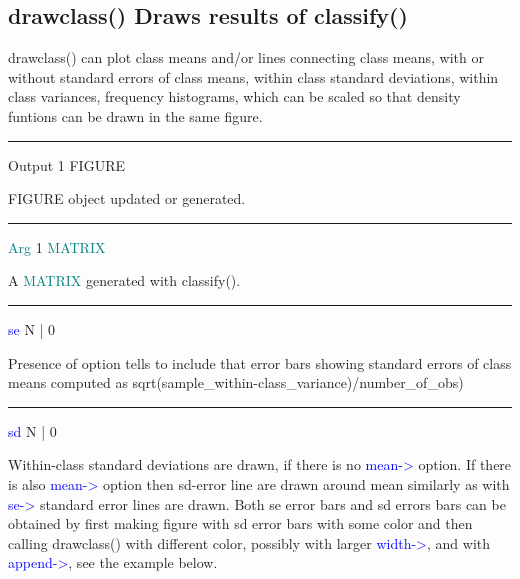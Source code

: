 \subsection{\textcolor{VioletRed}{drawclass}() Draws results of \textcolor{VioletRed}{classify}()} 
\label{drawclass} 
\textcolor{VioletRed}{drawclass}() can plot class means and/or lines connecting class means, with 
or without standard errors of class means, within class standard deviations, 
within class variances, frequency histograms, which can be scaled so that 
density funtions can be drawn in the same figure. 
\vspace{0.3cm} 
\hrule 
\vspace{0.3cm} 
\noindent Output  \tabto{3cm} 1  \tabto{5cm}   FIGURE  \tabto{7cm} 
\begin{changemargin}{3cm}{0cm} 
\noindent  FIGURE object updated or generated. 
\end{changemargin} 
\vspace{0.3cm} 
\hrule 
\vspace{0.3cm} 
\noindent \textcolor{teal}{Arg}  \tabto{3cm}  1 \tabto{5cm}   \textcolor{teal}{MATRIX}  \tabto{7cm} 
\begin{changemargin}{3cm}{0cm} 
\noindent  A \textcolor{teal}{MATRIX} generated with \textcolor{VioletRed}{classify}(). 
\end{changemargin} 
\vspace{0.3cm} 
\hrule 
\vspace{0.3cm} 
\noindent \textcolor{blue}{se}  \tabto{3cm}  N | 0  \tabto{5cm}    \tabto{7cm} 
\begin{changemargin}{3cm}{0cm} 
\noindent Presence of option tells to include that error bars showing standard errors 
of class means computed as \textcolor{VioletRed}{sqrt}(sample\_within-class\_variance)/number\_of\_obs) 
\end{changemargin} 
\vspace{0.3cm} 
\hrule 
\vspace{0.3cm} 
\noindent \textcolor{blue}{sd}  \tabto{3cm}  N | 0  \tabto{5cm}    \tabto{7cm} 
\begin{changemargin}{3cm}{0cm} 
\noindent  Within-class standard deviations are drawn, if there is no \textcolor{blue}{mean->} 
option. If there is also \textcolor{blue}{mean->} option then sd-error line are drawn 
around mean similarly as with \textcolor{blue}{se->} standard error lines are drawn. Both se error bars and sd errors bars 
can be obtained by first making figure with sd error bars with some color 
and then calling \textcolor{VioletRed}{drawclass}() with different color, possibly with larger 
\textcolor{blue}{width->}, and with \textcolor{blue}{append->}, see the example below. 
\end{changemargin} 
